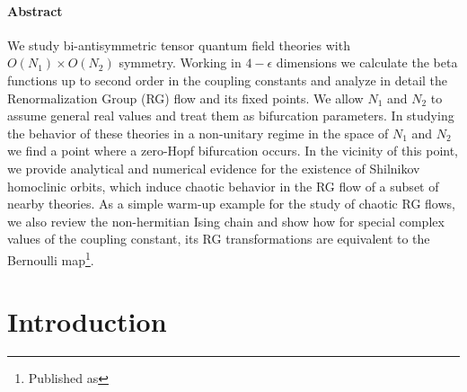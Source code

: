 \paragraph{{\color{header1}Abstract}}We study bi-antisymmetric tensor quantum field theories with $O(N_1)\times O(N_2)$ symmetry. Working in $4-\epsilon$ dimensions we calculate the beta functions up to second order in the coupling constants and analyze in detail the Renormalization Group (RG) flow and its fixed points. We allow $N_1$ and $N_2$ to assume general real values and treat them as bifurcation parameters. In studying the behavior of these theories in a non-unitary regime in the space of $N_1$ and $N_2$ we find a point where a zero-Hopf bifurcation occurs. In the vicinity of this point, we provide analytical and numerical evidence for the existence of Shilnikov homoclinic orbits, which induce chaotic behavior in the RG flow of a subset of nearby theories. As a simple warm-up example for the study of chaotic RG flows, we also review the non-hermitian Ising chain and show how for special complex values of the coupling constant, its RG transformations are equivalent to the Bernoulli map\footnote{Published as
}.

\section{Introduction}

